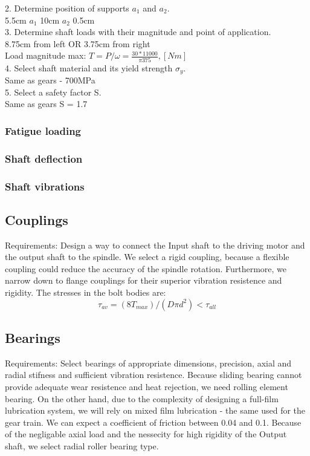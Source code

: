 \documentclass{article}
\begin{document}
2. Determine position of supports $a_1$ and $a_2$. \\
5.5cm $a_1$ 10cm $a_2$ 0.5cm \\

3. Determine shaft loads with their magnitude and point of application. \\
8.75cm from left OR
3.75cm from right  \\
Load magnitude max: $T = P / \omega = \frac{30*11000}{\pi 375}, [Nm]$ \\

4. Select shaft material and its yield strength $\sigma_y$. \\
Same as gears - 700MPa \\

5. Select a safety factor S. \\
Same as gears S = 1.7 \\


\subsubsection{Fatigue loading}
\subsubsection{Shaft deflection}
\subsubsection{Shaft vibrations}

\subsection{Couplings}
Requirements: Design a way to connect the Input shaft to the driving motor and the output shaft to the spindle.
We select a rigid coupling, because a flexible coupling could reduce the accuracy of the spindle rotation.
Furthermore, we narrow down to flange couplings for their superior vibration resistence and rigidity.
The stresses in the bolt bodies are:
$$\tau_{av} = (8 T_{max}) / (D \pi d^2) < \tau_{all}$$  %

\subsection{Bearings}
Requirements: Select bearings of appropriate dimensions, precision, axial and radial stifness and sufficient vibration resistence.
Because sliding bearing cannot provide adequate wear resistence and heat rejection, we need rolling element bearing.
On the other hand, due to the complexity of designing a full-film lubrication system, we will rely on mixed film lubrication - the same used for the gear train.
We can expect a coefficient of friction between 0.04 and 0.1.
Because of the negligable axial load and the nessecity for high rigidity of the Output shaft, we select radial roller bearing type.
\end{document}
